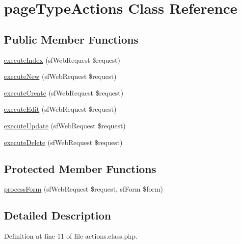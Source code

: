 \hypertarget{classpage_type_actions}{\section{page\-Type\-Actions Class Reference}
\label{classpage_type_actions}
}
\subsection*{Public Member Functions}
\begin{DoxyCompactItemize}
\item 
\hyperlink{classpage_type_actions_a948cc911eb1d9f77990be54af3b2080f}{execute\-Index} (sf\-Web\-Request \$request)
\item 
\hyperlink{classpage_type_actions_a0ffbea56560c6c633dae68ec22aff21c}{execute\-New} (sf\-Web\-Request \$request)
\item 
\hyperlink{classpage_type_actions_a75837617743fb64dca82d8133b2c662a}{execute\-Create} (sf\-Web\-Request \$request)
\item 
\hyperlink{classpage_type_actions_af4d8fedd4b28f3398826a1bb8fa54394}{execute\-Edit} (sf\-Web\-Request \$request)
\item 
\hyperlink{classpage_type_actions_af7b4f51862add3c2ebb54efc136a0840}{execute\-Update} (sf\-Web\-Request \$request)
\item 
\hyperlink{classpage_type_actions_a52b5b11b11a0070dd2662257520c045a}{execute\-Delete} (sf\-Web\-Request \$request)
\end{DoxyCompactItemize}
\subsection*{Protected Member Functions}
\begin{DoxyCompactItemize}
\item 
\hyperlink{classpage_type_actions_a7cf661d837626e0320753cbffa019a01}{process\-Form} (sf\-Web\-Request \$request, sf\-Form \$form)
\end{DoxyCompactItemize}


\subsection{Detailed Description}


Definition at line 11 of file actions.\-class.\-php.



